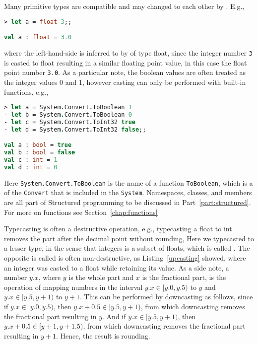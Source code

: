 Many primitive types are compatible and may changed to each other by . E.g.,
\begin{lstlisting}[language=fsharp,caption={fsharpi},label=upcasting]
> let a = float 3;;

val a : float = 3.0
\end{lstlisting}
where the left-hand-side is inferred to by of type float, since the integer number \lstinline|3| is casted to float resulting in a similar floating point value, in this case the float point number \lstinline|3.0|. As a particular note, the boolean values are often treated as the integer values 0 and 1, however casting can only be performed with built-in functions, e.g., \begin{lstlisting}[language=fsharp,caption={fsharpi}]
> let a = System.Convert.ToBoolean 1    
- let b = System.Convert.ToBoolean 0    
- let c = System.Convert.ToInt32 true   
- let d = System.Convert.ToInt32 false;;

val a : bool = true
val b : bool = false
val c : int = 1
val d : int = 0
\end{lstlisting}
Here \lstinline|System.Convert.ToBoolean| is the name of a function \lstinline|ToBoolean|, which is a  of the  \lstinline|Convert| that is included in the  \lstinline|System|. Namespaces, classes, and members are all part of Structured programming to be discussed in Part~\ref{part:structured}. For more on functions see Section~\ref{chap:functions}

Typecasting is often a destructive operation, e.g., typecasting a float to int removes the part after the decimal point without rounding,
%
%
Here we typecasted to a lesser type, in the sense that integers is a subset of floats, which is called . The opposite is called  is often non-destructive, as Listing~\ref{upcasting} showed, where an integer was casted to a float while retaining its value. As a side note,  a number $y.x$, where $y$ is the whole part and $x$ is the fractional part, is the operation of mapping numbers in the interval $y.x \in [y.0,y.5)$ to $y$ and $y.x\in [y.5,y+1)$ to $y+1$. This can be performed by downcasting as follows,
%
%
since if $y.x\in [y.0, y.5)$, then $y.x+0.5\in [y.5, y+1)$, from which downcasting removes the fractional part resulting in $y$. And if $y.x\in [y.5, y+1)$, then $y.x+0.5\in [y+1,y+1.5)$, from which downcasting removes the fractional part resulting in $y+1$. Hence, the result is rounding. 

